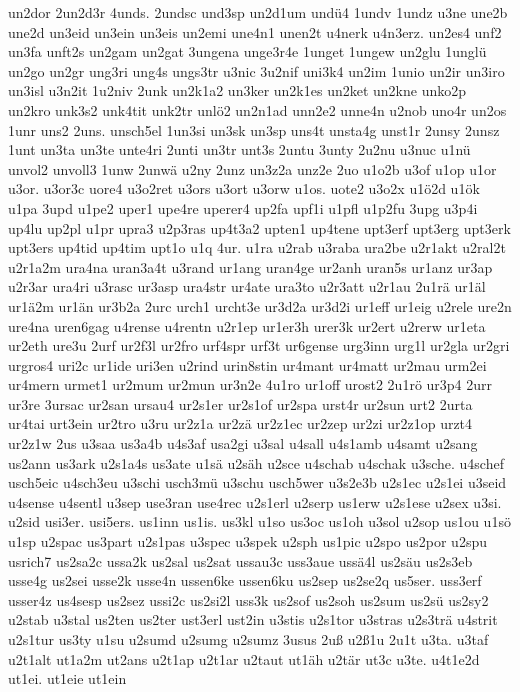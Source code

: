 {un2dor
2un2d3r
4unds.
2undsc
und3sp
un2d1um
undü4
1undv
1undz
u3ne
une2b
une2d
un3eid
un3ein
un3eis
un2emi
une4n1
unen2t
u4nerk
u4n3erz.
un2es4
unf2
un3fa
unft2s
un2gam
un2gat
3ungena
unge3r4e
1unget
1ungew
un2glu
1unglü
un2go
un2gr
ung3ri
ung4s
ungs3tr
u3nic
3u2nif
uni3k4
un2im
1unio
un2ir
un3iro
un3isl
u3n2it
1u2niv
2unk
un2k1a2
un3ker
un2k1es
un2ket
un2kne
unko2p
un2kro
unk3s2
unk4tit
unk2tr
unlö2
un2n1ad
unn2e2
unne4n
u2nob
uno4r
un2os
1unr
uns2
2uns.
unsch5el
1un3si
un3sk
un3sp
uns4t
unsta4g
unst1r
2unsy
2unsz
1unt
un3ta
un3te
unte4ri
2unti
un3tr
unt3s
2untu
3unty
2u2nu
u3nuc
u1nü
unvol2
unvoll3
1unw
2unwä
u2ny
2unz
un3z2a
unz2e
2uo
u1o2b
u3of
u1op
u1or
u3or.
u3or3c
uore4
u3o2ret
u3ors
u3ort
u3orw
u1os.
uote2
u3o2x
u1ö2d
u1ök
u1pa
3upd
u1pe2
uper1
upe4re
uperer4
up2fa
upf1i
u1pfl
u1p2fu
3upg
u3p4i
up4lu
up2pl
u1pr
upra3
u2p3ras
up4t3a2
upten1
up4tene
upt3erf
upt3erg
upt3erk
upt3ers
up4tid
up4tim
upt1o
u1q
4ur.
u1ra
u2rab
u3raba
ura2be
u2r1akt
u2ral2t
u2r1a2m
ura4na
uran3a4t
u3rand
ur1ang
uran4ge
ur2anh
uran5s
ur1anz
ur3ap
u2r3ar
ura4ri
u3rasc
ur3asp
ura4str
ur4ate
ura3to
u2r3att
u2r1au
2u1rä
ur1äl
ur1ä2m
ur1än
ur3b2a
2urc
urch1
urcht3e
ur3d2a
ur3d2i
ur1eff
ur1eig
u2rele
ure2n
ure4na
uren6gag
u4rense
u4rentn
u2r1ep
ur1er3h
urer3k
ur2ert
u2rerw
ur1eta
ur2eth
ure3u
2urf
ur2f3l
ur2fro
urf4spr
urf3t
ur6gense
urg3inn
urg1l
ur2gla
ur2gri
urgros4
uri2c
ur1ide
uri3en
u2rind
urin8stin
ur4mant
ur4matt
ur2mau
urm2ei
ur4mern
urmet1
ur2mum
ur2mun
ur3n2e
4u1ro
ur1off
urost2
2u1rö
ur3p4
2urr
ur3re
3ursac
ur2san
ursau4
ur2s1er
ur2s1of
ur2spa
urst4r
ur2sun
urt2
2urta
ur4tai
urt3ein
ur2tro
u3ru
ur2z1a
ur2zä
ur2z1ec
ur2zep
ur2zi
ur2z1op
urzt4
ur2z1w
2us
u3saa
us3a4b
u4s3af
usa2gi
u3sal
u4sall
u4s1amb
u4samt
u2sang
us2ann
us3ark
u2s1a4s
us3ate
u1sä
u2säh
u2sce
u4schab
u4schak
u3sche.
u4schef
usch5eic
u4sch3eu
u3schi
usch3mü
u3schu
usch5wer
u3s2e3b
u2s1ec
u2s1ei
u3seid
u4sense
u4sentl
u3sep
use3ran
use4rec
u2s1erl
u2serp
us1erw
u2s1ese
u2sex
u3si.
u2sid
usi3er.
usi5ers.
us1inn
us1is.
us3kl
u1so
us3oc
us1oh
u3sol
u2sop
us1ou
u1sö
u1sp
u2spac
us3part
u2s1pas
u3spec
u3spek
u2sph
us1pic
u2spo
us2por
u2spu
usrich7
us2sa2c
ussa2k
us2sal
us2sat
ussau3c
uss3aue
ussä4l
us2säu
us2s3eb
usse4g
us2sei
usse2k
usse4n
ussen6ke
ussen6ku
us2sep
us2se2q
us5ser.
uss3erf
usser4z
us4sesp
us2sez
ussi2c
us2si2l
uss3k
us2sof
us2soh
us2sum
us2sü
us2sy2
u2stab
u3stal
us2ten
us2ter
ust3erl
ust2in
u3stis
u2s1tor
u3stras
u2s3trä
u4strit
u2s1tur
us3ty
u1su
u2sumd
u2sumg
u2sumz
3usus
2uß
u2ß1u
2u1t
u3ta.
u3taf
u2t1alt
ut1a2m
ut2ans
u2t1ap
u2t1ar
u2taut
ut1äh
u2tär
ut3c
u3te.
u4t1e2d
ut1ei.
ut1eie
ut1ein
}
